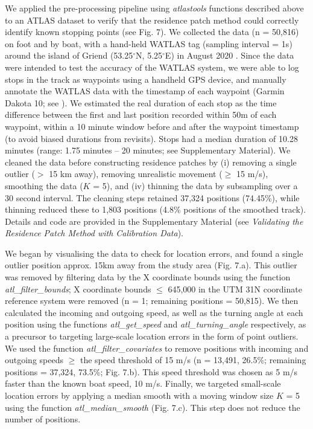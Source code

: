 \begin{refsection}[sorting=nyt]
    We applied the pre-processing pipeline using \textit{atlastools} functions described above to an ATLAS dataset to verify that the residence patch method could correctly identify known stopping points (see Fig. 7).
    We collected the data (n = 50,816) on foot and by boat, with a hand-held WATLAS tag (sampling interval = 1s) around the island of Griend (53.25$^{\circ}$N, 5.25$^{\circ}$E) in August 2020 \citep[WATLAS: Wadden Sea ATLAS system][Bijleveld et al. \textit{in prep.}]{beardsworth2021}.
    Since the data were intended to test the accuracy of the WATLAS system, we were able to log stops in the track as waypoints using a handheld GPS device, and manually annotate the WATLAS data with the timestamp of each waypoint (Garmin Dakota 10; see \citealt{beardsworth2021}).
    We estimated the real duration of each stop as the time difference between the first and last position recorded within 50m of each waypoint, within a 10 minute window before and after the waypoint timestamp (to avoid biased durations from revisits).
    Stops had a median duration of 10.28 minutes (range: 1.75 minutes -- 20 minutes; see Supplementary Material).
    We cleaned the data before constructing residence patches by (i) removing a single outlier ($>$ 15 km away), removing unrealistic movement ($\geq$ 15 m/s), smoothing the data ($K$ = 5), and (iv) thinning the data by subsampling over a 30 second interval.
    The cleaning steps retained 37,324 positions (74.45\%), while thinning reduced these to 1,803 positions (4.8\% positions of the smoothed track).
    Details and code are provided in the Supplementary Material (see \textit{Validating the Residence Patch Method with Calibration Data}).

    We began by visualising the data to check for location errors, and found a single outlier position approx. 15km away from the study area (Fig. 7.a).
    This outlier was removed by filtering data by the X coordinate bounds using the function \textit{atl\_filter\_bounds}; X coordinate bounds $\leq$ 645,000 in the UTM 31N coordinate reference system were removed (n = 1; remaining positions = 50,815).
    We then calculated the incoming and outgoing speed, as well as the turning angle at each position using the functions \textit{atl\_get\_speed} and \textit{atl\_turning\_angle} respectively, as a precursor to targeting large-scale location errors in the form of point outliers.
    We used the function \textit{atl\_filter\_covariates} to remove positions with incoming and outgoing speeds $\geq$ the speed threshold of 15 m/s (n = 13,491, 26.5\%; remaining positions = 37,324, 73.5\%; Fig. 7.b).
    This speed threshold was chosen as 5 m/s faster than the known boat speed, 10 m/s.
    Finally, we targeted small-scale location errors by applying a median smooth with a moving window size $K$ = 5 using the function \textit{atl\_median\_smooth} (Fig. 7.c).
    This step does not reduce the number of positions.


\end{refsection}

